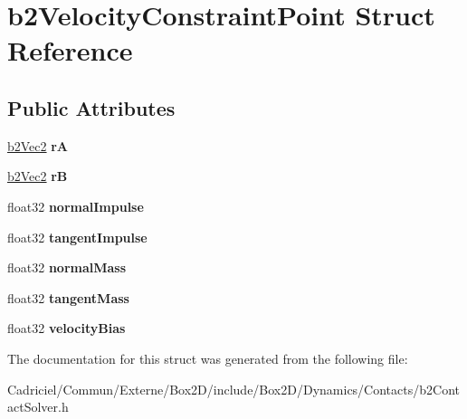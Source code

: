 \hypertarget{structb2_velocity_constraint_point}{}\section{b2\+Velocity\+Constraint\+Point Struct Reference}
\label{structb2_velocity_constraint_point}
\subsection*{Public Attributes}
\begin{DoxyCompactItemize}
\item 
\hyperlink{structb2_vec2}{b2\+Vec2} {\bfseries rA}\hypertarget{structb2_velocity_constraint_point_a0be704259cd5d3902d8581e186546e5e}{}\label{structb2_velocity_constraint_point_a0be704259cd5d3902d8581e186546e5e}

\item 
\hyperlink{structb2_vec2}{b2\+Vec2} {\bfseries rB}\hypertarget{structb2_velocity_constraint_point_ab5d1c98e09e2f859b71f6d0fda46c0d5}{}\label{structb2_velocity_constraint_point_ab5d1c98e09e2f859b71f6d0fda46c0d5}

\item 
float32 {\bfseries normal\+Impulse}\hypertarget{structb2_velocity_constraint_point_a304653be2ca1c1daa72d7b7868b37b11}{}\label{structb2_velocity_constraint_point_a304653be2ca1c1daa72d7b7868b37b11}

\item 
float32 {\bfseries tangent\+Impulse}\hypertarget{structb2_velocity_constraint_point_ac3e3be335d204bb6a89a7303831cc89b}{}\label{structb2_velocity_constraint_point_ac3e3be335d204bb6a89a7303831cc89b}

\item 
float32 {\bfseries normal\+Mass}\hypertarget{structb2_velocity_constraint_point_a5997e9781cedbd86333a84a967b59c33}{}\label{structb2_velocity_constraint_point_a5997e9781cedbd86333a84a967b59c33}

\item 
float32 {\bfseries tangent\+Mass}\hypertarget{structb2_velocity_constraint_point_a029692226a637f5e687022041b25043c}{}\label{structb2_velocity_constraint_point_a029692226a637f5e687022041b25043c}

\item 
float32 {\bfseries velocity\+Bias}\hypertarget{structb2_velocity_constraint_point_a81d492345d9b1c8f51ec10154ab840f2}{}\label{structb2_velocity_constraint_point_a81d492345d9b1c8f51ec10154ab840f2}

\end{DoxyCompactItemize}


The documentation for this struct was generated from the following file\+:\begin{DoxyCompactItemize}
\item 
Cadriciel/\+Commun/\+Externe/\+Box2\+D/include/\+Box2\+D/\+Dynamics/\+Contacts/b2\+Contact\+Solver.\+h\end{DoxyCompactItemize}
